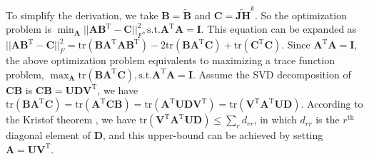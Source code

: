 To simplify the derivation, we take $\mathbf{B} = \widetilde{\mathbf{B}}$ and $\mathbf{C} = \widetilde{\mathbf{JH}}^{k}$. So the optimization problem is $\min_{\mathbf{A}} ||\mathbf{A}\mathbf{B}^{\text{T}} - \mathbf{C}||_F^2, \text{s.t.} \mathbf{A}^{\text{T}} \mathbf{A} = \mathbf{I}$. This equation can be expanded as $||\mathbf{A}\mathbf{B}^{\text{T}} - \mathbf{C}||_F^2 = \text{tr}(\mathbf{BA}^{\text{T}}\mathbf{A}\mathbf{B}^{\text{T}}) - 2\text{tr}(\mathbf{B}\mathbf{A}^{\text{T}}\mathbf{C}) + \text{tr}(\mathbf{C}^{\text{T}}\mathbf{C})$. Since $\mathbf{A}^{\text{T}}\mathbf{A} = \mathbf{I}$, the above optimization problem equivalents to maximizing a trace function problem, $\max_{\mathbf{A}} \text{tr}(\mathbf{B}\mathbf{A}^{\text{T}}\mathbf{C}), \text{s.t.} \mathbf{A}^{\text{T}} \mathbf{A} = \mathbf{I}$. Assume the SVD decomposition of $\mathbf{C}\mathbf{B}$ is $\mathbf{C}\mathbf{B} = \mathbf{UDV}^{\text{T}}$, we have $\text{tr}(\mathbf{B}\mathbf{A}^{\text{T}}\mathbf{C}) = \text{tr}(\mathbf{A}^{\text{T}}\mathbf{C}\mathbf{B}) = \text{tr}(\mathbf{A}^{\text{T}}\mathbf{UDV}^{\text{T}}) = \text{tr}(\mathbf{V}^{\text{T}}\mathbf{A}^{\text{T}}\mathbf{UD})$. According to the Kristof theorem \cite{ten1993least}, we have $\text{tr}(\mathbf{V}^{\text{T}}\mathbf{A}^{\text{T}}\mathbf{UD}) \leq \sum_{r}d_{rr}$, in which $d_{rr}$ is the $r^{\text{th}}$ diagonal element of $\mathbf{D}$, and this upper-bound can be achieved by setting $\mathbf{A} = \mathbf{UV}^{\text{T}}$.

